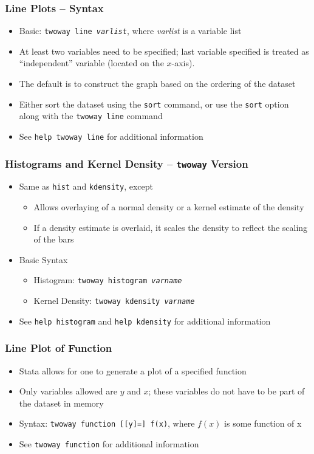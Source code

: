 \documentclass{beamer}
\begin{document}
\begin{frame}
	\frametitle{Line Plots -- Syntax}
	
	\begin{itemize}
		\item Basic: \texttt{twoway line \textit{varlist}}, where \textit{varlist} is a variable list
		\item At least two variables need to be specified; last variable specified is treated as ``independent'' variable (located on the $x$-axis).
		\item The default is to construct the graph based on the ordering of the dataset
		\item Either sort the dataset using the \texttt{sort} command, or use the \texttt{sort} option along with the \texttt{twoway line} command
		\item See \texttt{help twoway line} for additional information
	\end{itemize}
\end{frame}

\begin{frame}
	\frametitle{Histograms and Kernel Density -- \texttt{twoway} Version}
	
	\begin{itemize}
		\item Same as \texttt{hist} and \texttt{kdensity}, except
		\begin{itemize}
			\item Allows overlaying of a normal density or a kernel estimate of the density
			\item If a density estimate is overlaid, it scales the density to reflect the scaling of the bars
		\end{itemize}
		\item Basic Syntax
		\begin{itemize}
			\item Histogram: \texttt{twoway histogram \textit{varname}}
			\item Kernel Density: \texttt{twoway kdensity \textit{varname}}
		\end{itemize}
		\item See \texttt{help histogram} and \texttt{help kdensity} for additional information
	\end{itemize}
\end{frame}

\begin{frame}
	\frametitle{Line Plot of Function}
	
	\begin{itemize}
		\item Stata allows for one to generate a plot of a specified function
		\item Only variables allowed are $y$ and $x$; these variables do not have to be part of the dataset in memory
		\item Syntax: \texttt{twoway function [[y]=] f(x)}, where $f(x)$ is some function of x
		\item See \texttt{twoway function} for additional information
	\end{itemize}
\end{frame}
\end{document}
